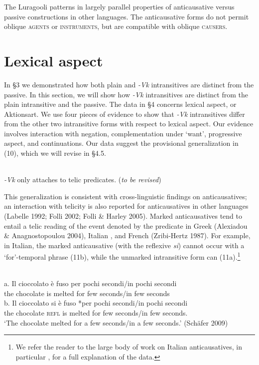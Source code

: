 \documentclass[output=paper]{langsci/langscibook}
\begin{document}
The Luragooli patterns in  largely parallel properties of anticausative versus passive constructions in other languages. The anticausative forms do not permit oblique \textsc{agents} or \textsc{instruments}, but are compatible with oblique \textsc{causers.}

\section{Lexical aspect}

In §3 we demonstrated how both plain and \textit{-Vk} intransitives are distinct from the passive. In this section, we will show how \textit{-Vk }intransitives are distinct from the plain intransitive and the passive. The data in §4 concerns lexical aspect, or Aktionsart. We use four pieces of evidence to show that \textit{-Vk} intransitives differ from the other two intransitive forms with respect to lexical aspect. Our evidence involves interaction with negation, complementation under ‘want’, progressive aspect, and continuations. Our data suggest the provisional generalization in (10), which we will revise in §4.5.

\ea\label{exx:}
{}\\
 \textit{-Vk }only attaches to telic predicates. (\textit{to be revised})
\z

This generalization is consistent with cross-linguistic findings on anticausatives; an interaction with telicity is also reported for anticausatives in other languages (Labelle 1992; Folli 2002; Folli \& Harley 2005). Marked anticausatives tend to entail a telic reading of the event denoted by the predicate in Greek (Alexiadou \& Anagnostopoulou 2004), Italian \citep{Folli2002}, and French (Zribi-Hertz 1987). For example, in Italian, the marked anticausative (with the reflexive \textit{si}) cannot occur with a ‘for’-temporal phrase (11b), while the unmarked intransitive form can (11a).\footnote{ We refer the reader to the large body of work on Italian anticausatives, in particular \citet{Folli2002}, for a full explanation of the data.}

\ea\label{exx:}
\ea
{}\\
\ex
\gll a.  Il   cioccolato è  fuso     per pochi secondi/in pochi secondi\\
       the chocolate  is melted for few    seconds/in few    seconds\\
\ex       
\gll b.  Il    cioccolato si     è  fuso     *per pochi secondi/in pochi secondi\\
       the chocolate  \textsc{refl} is melted  for   few   seconds/in few seconds. \\
\glt ‘The chocolate melted for a few seconds/in a few seconds.’     (Schäfer 2009)
\z
\z
\end{document}
